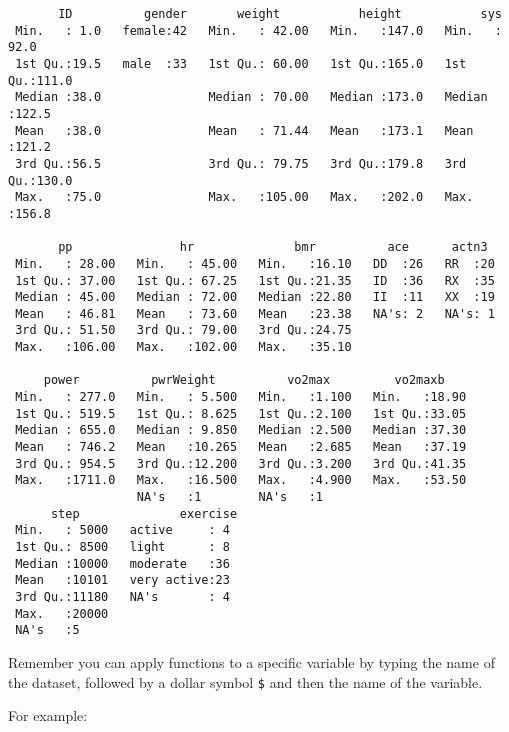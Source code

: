 \documentclass[
  letterpaper,
  DIV=11,
  numbers=noendperiod]{scrartcl}
\newenvironment{Shaded}{\begin{snugshade}}{\end{snugshade}}
\newcommand{\FunctionTok}[1]{\textcolor[rgb]{0.28,0.35,0.67}{#1}}
\newcommand{\NormalTok}[1]{\textcolor[rgb]{0.00,0.23,0.31}{#1}}
\newcommand{\SpecialCharTok}[1]{\textcolor[rgb]{0.37,0.37,0.37}{#1}}
\begin{document}
\begin{verbatim}
       ID          gender       weight           height           sys       
 Min.   : 1.0   female:42   Min.   : 42.00   Min.   :147.0   Min.   : 92.0  
 1st Qu.:19.5   male  :33   1st Qu.: 60.00   1st Qu.:165.0   1st Qu.:111.0  
 Median :38.0               Median : 70.00   Median :173.0   Median :122.5  
 Mean   :38.0               Mean   : 71.44   Mean   :173.1   Mean   :121.2  
 3rd Qu.:56.5               3rd Qu.: 79.75   3rd Qu.:179.8   3rd Qu.:130.0  
 Max.   :75.0               Max.   :105.00   Max.   :202.0   Max.   :156.8  
                                                                            
       pp               hr              bmr          ace      actn3   
 Min.   : 28.00   Min.   : 45.00   Min.   :16.10   DD  :26   RR  :20  
 1st Qu.: 37.00   1st Qu.: 67.25   1st Qu.:21.35   ID  :36   RX  :35  
 Median : 45.00   Median : 72.00   Median :22.80   II  :11   XX  :19  
 Mean   : 46.81   Mean   : 73.60   Mean   :23.38   NA's: 2   NA's: 1  
 3rd Qu.: 51.50   3rd Qu.: 79.00   3rd Qu.:24.75                      
 Max.   :106.00   Max.   :102.00   Max.   :35.10                      
                                                                      
     power          pwrWeight          vo2max         vo2maxb     
 Min.   : 277.0   Min.   : 5.500   Min.   :1.100   Min.   :18.90  
 1st Qu.: 519.5   1st Qu.: 8.625   1st Qu.:2.100   1st Qu.:33.05  
 Median : 655.0   Median : 9.850   Median :2.500   Median :37.30  
 Mean   : 746.2   Mean   :10.265   Mean   :2.685   Mean   :37.19  
 3rd Qu.: 954.5   3rd Qu.:12.200   3rd Qu.:3.200   3rd Qu.:41.35  
 Max.   :1711.0   Max.   :16.500   Max.   :4.900   Max.   :53.50  
                  NA's   :1        NA's   :1                      
      step              exercise 
 Min.   : 5000   active     : 4  
 1st Qu.: 8500   light      : 8  
 Median :10000   moderate   :36  
 Mean   :10101   very active:23  
 3rd Qu.:11180   NA's       : 4  
 Max.   :20000                   
 NA's   :5                       
\end{verbatim}

Remember you can apply functions to a specific variable by typing the
name of the dataset, followed by a dollar symbol \texttt{\$} and then
the name of the variable.

For example:

\begin{Shaded}
\end{Shaded}
\end{document}
